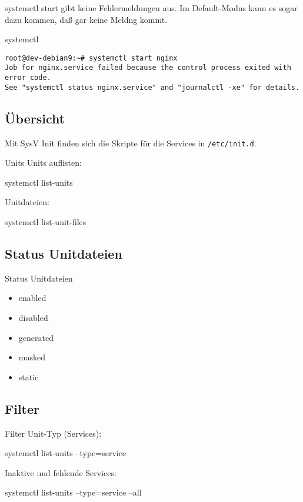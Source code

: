 systemctl start gibt keine Fehlermeldungen aus. Im Default-Modus kann es sogar dazu kommen, daß gar keine Meldng kommt.

\begin{frame}[fragile]{systemctl}
\begin{lstlisting}
root@dev-debian9:~# systemctl start nginx
Job for nginx.service failed because the control process exited with error code.
See "systemctl status nginx.service" and "journalctl -xe" for details.
\end{lstlisting}
\end{frame}

\subsection{Übersicht}

Mit SysV Init finden sich die Skripte für die Services in \verb|/etc/init.d|.

\begin{frame}{Units}
Units auflisten:

    systemctl list-units

Unitdateien:

systemctl list-unit-files
\end{frame}

\subsection{Status Unitdateien}

\begin{frame}[fragile]{Status Unitdateien}
\begin{itemize}
\item enabled
\item disabled
\item generated
\item masked
\item static
\end{itemize}
\end{frame}

\subsection{Filter}

\begin{frame}{Filter}
Unit-Typ (Services):

    systemctl list-units --type=service

Inaktive und fehlende Services:

    systemctl list-units --type=service --all  
\end{frame}
  
